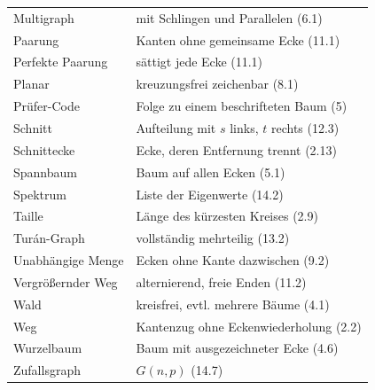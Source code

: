 \begin{merksatz}
\begin{center}
{\begin{longtable}{@{}P{3.0cm}P{5.6cm}@{}}
Multigraph & mit Schlingen und Parallelen (6.1)\\
Paarung & Kanten ohne gemeinsame Ecke (11.1)\\
Perfekte Paarung & sättigt jede Ecke (11.1)\\
Planar & kreuzungsfrei zeichenbar (8.1)\\
Prüfer-Code & Folge zu einem beschrifteten Baum (5)\\
Schnitt & Aufteilung mit $s$ links, $t$ rechts (12.3)\\
Schnittecke & Ecke, deren Entfernung trennt (2.13)\\
Spannbaum & Baum auf allen Ecken (5.1)\\
Spektrum & Liste der Eigenwerte (14.2)\\
Taille & Länge des kürzesten Kreises (2.9)\\
Turán-Graph & vollständig mehrteilig (13.2)\\
Unabhängige Menge & Ecken ohne Kante dazwischen (9.2)\\
Vergrößernder Weg & alternierend, freie Enden (11.2)\\
Wald & kreisfrei, evtl. mehrere Bäume (4.1)\\
Weg & Kantenzug ohne Eckenwiederholung (2.2)\\
Wurzelbaum & Baum mit ausgezeichneter Ecke (4.6)\\
Zufallsgraph & $G(n,p)$ (14.7)\\
\bottomrule
\end{longtable}}
\end{center}
\end{merksatz}
